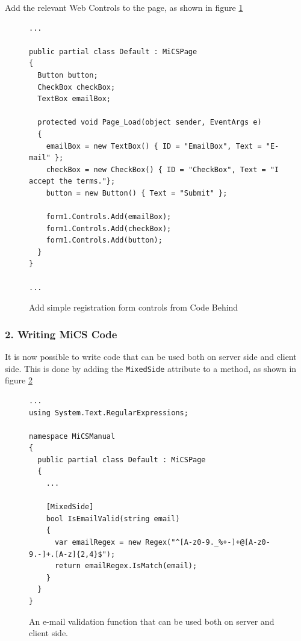 Add the relevant Web Controls to the page, as shown in figure \ref{fig:mics_add_controls}

\begin{figure}[H]
\begin{lstlisting}[language=CSharp,classoffset=1,morekeywords={Default,MiCSPage,Button,CheckBox,TextBox,EventArgs,ClientSide,InputElement,Document,CheckBoxElement,Window,MixedSide,Regex}]
...

public partial class Default : MiCSPage
{
  Button button;
  CheckBox checkBox;
  TextBox emailBox;

  protected void Page_Load(object sender, EventArgs e)
  {
    emailBox = new TextBox() { ID = "EmailBox", Text = "E-mail" };
    checkBox = new CheckBox() { ID = "CheckBox", Text = "I accept the terms."};
    button = new Button() { Text = "Submit" };

    form1.Controls.Add(emailBox);
    form1.Controls.Add(checkBox);
    form1.Controls.Add(button);
  }
}

...
\end{lstlisting}
\caption{Add simple registration form controls from Code Behind}
\label{fig:mics_add_controls}
\end{figure}



\subsubsection{2. Writing MiCS Code} %
\label{ssub:writing_mics_code}
It is now possible to write code that can be used both on server side and client side. This is done by adding the \texttt{MixedSide} attribute to a method, as shown in figure \ref{fig:write_mics_code}

\begin{figure}[H]
\begin{lstlisting}[language=CSharp,classoffset=1,morekeywords={Default,MiCSPage,Button,CheckBox,TextBox,EventArgs,ClientSide,InputElement,Document,CheckBoxElement,Window,MixedSide,Regex}]
...
using System.Text.RegularExpressions;

namespace MiCSManual
{    
  public partial class Default : MiCSPage
  {
    ...

    [MixedSide]
    bool IsEmailValid(string email)
    {
      var emailRegex = new Regex("^[A-z0-9._%+-]+@[A-z0-9.-]+.[A-z]{2,4}$");
      return emailRegex.IsMatch(email);
    }
  }
}
\end{lstlisting}
\caption{An e-mail validation function that can be used both on server and client side.}
\label{fig:write_mics_code}
\end{figure}

